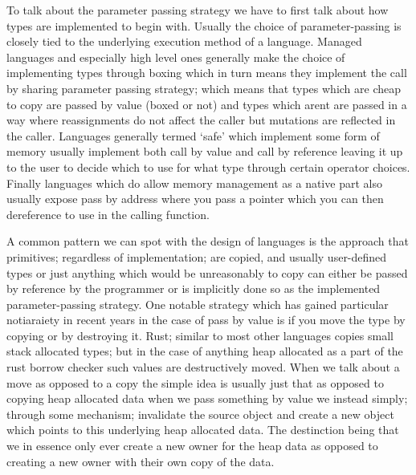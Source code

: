To talk about the parameter passing strategy we have to first talk about how types are implemented to begin with. Usually the choice of parameter-passing is closely tied to the underlying execution method of a language. Managed languages and especially high level ones generally make the choice of implementing types through boxing which in turn means they implement the call by sharing parameter passing strategy; which means that types which are cheap to copy are passed by value (boxed or not) and types which arent are passed in a way where reassignments do not affect the caller but mutations are reflected in the caller. Languages generally termed `safe' which implement some form of memory usually implement both call by value and call by reference leaving it up to the user to decide which to use for what type through certain operator choices. Finally languages which do allow memory management as a native part also usually expose pass by address where you pass a pointer which you can then dereference to use in the calling function. 

A common pattern we can spot with the design of languages is the approach that primitives; regardless of implementation; are copied, and usually user-defined types or just anything which would be unreasonably to copy can either be passed by reference by the programmer or is implicitly done so as the implemented parameter-passing strategy. One notable strategy which has gained particular notiaraiety in recent years in the case of pass by value is if you move the type by copying or by destroying it. Rust; similar to most other languages copies small stack allocated types; but in the case of anything heap allocated as a part of the rust borrow checker such values are destructively moved. When we talk about a move as opposed to a copy the simple idea is usually just that as opposed to copying heap allocated data when we pass something by value we instead simply; through some mechanism; invalidate the source object and create a new object which points to this underlying heap allocated data. The destinction being that we in essence only ever create a new owner for the heap data as opposed to creating a new owner with their own copy of the data. 

